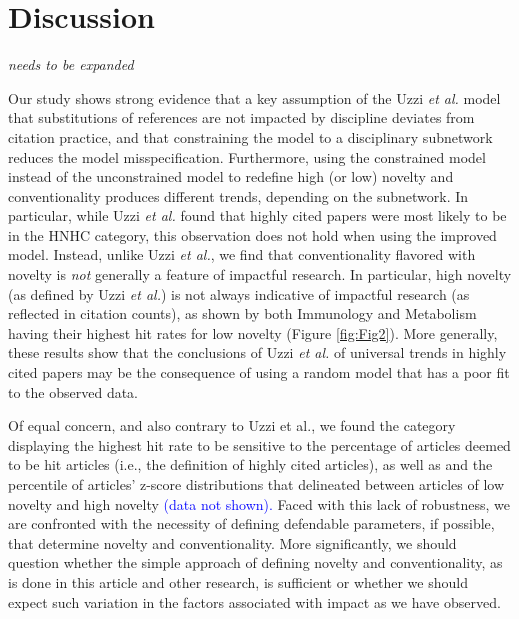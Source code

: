 \documentclass[NETN]{stjour}
\begin{document}
\section{Discussion}

\emph{needs to be expanded}

Our study shows strong evidence that a key assumption of the Uzzi {\em et al.} model that  
substitutions of references  are not impacted by discipline deviates from citation practice, and that
constraining the model to a disciplinary subnetwork reduces the model misspecification.
Furthermore,  using the constrained model instead of the unconstrained model to redefine high (or low) novelty and conventionality produces different trends, depending on the subnetwork.
In particular, while Uzzi {\em et al.} found that highly cited papers were most likely to be
in the HNHC category, this observation does not hold when using the improved model.
Instead, unlike Uzzi {\em et al.}, we find that conventionality flavored with novelty is {\em not} generally a feature of impactful research. 
In particular,   high novelty (as defined by Uzzi {\em et al.}) is
not always indicative of impactful research (as reflected in citation counts), as shown by both Immunology and Metabolism having their highest hit rates for low novelty (Figure \ref{fig:Fig2}).
More generally, these results show that the conclusions of Uzzi {\em et al.} of universal trends in highly cited papers
may be the consequence of using a random model that has a poor fit to the observed data.


Of equal concern, and also contrary to Uzzi et al., we found the category displaying the highest hit rate to be sensitive to the percentage of articles deemed to be hit articles (i.e., the definition of highly cited articles), as well as   and the percentile of articles' z-score distributions that delineated between articles of low novelty and high novelty \textcolor{blue}{(data not shown).}
Faced with this lack of robustness, we are confronted with the necessity of defining defendable parameters, if possible, that determine novelty and conventionality. 
More significantly, we should question whether the simple approach of defining novelty and conventionality, as is done in this article and other research, is sufficient or whether we should expect such variation in the factors associated with impact as we have observed.
\end{document}
